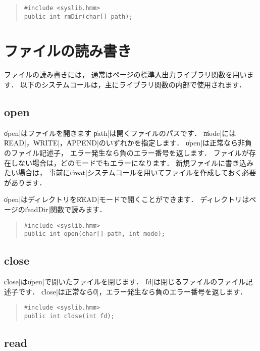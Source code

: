 \begin{quote}
\begin{verbatim}
#include <syslib.hmm>
public int rmDir(char[] path);
\end{verbatim}
\end{quote}

\section{ファイルの読み書き}

ファイルの読み書きには，
通常は\pageref{chap4:stdio}ページの標準入出力ライブラリ関数を用います．
以下のシステムコールは，主にライブラリ関数の内部で使用されます．

\subsection{open}

\|open|はファイルを開きます
\|path|は開くファイルのパスです．
\|mode|には\|READ|，\|WRITE|，\|APPEND|のいずれかを指定します．
\|open|は正常なら非負のファイル記述子，
エラー発生なら負のエラー番号を返します．
ファイルが存在しない場合は，どのモードでもエラーになります．
新規ファイルに書き込みたい場合は，
事前に\|creat|システムコールを用いてファイルを作成しておく必要があります．

\|open|はディレクトリを\|READ|モードで開くことができます．
ディレクトリは\pageref{chap4:readDir}ページの\|readDir|関数で読みます．

\begin{quote}
\begin{verbatim}
#include <syslib.hmm>
public int open(char[] path, int mode);
\end{verbatim}
\end{quote}

\subsection{close}

\|close|は\|open|で開いたファイルを閉じます．
\|fd|は閉じるファイルのファイル記述子です．
\|close|は正常なら\|0|，エラー発生なら負のエラー番号を返します．

\begin{quote}
\begin{verbatim}
#include <syslib.hmm>
public int close(int fd);
\end{verbatim}
\end{quote}

\subsection{read}

